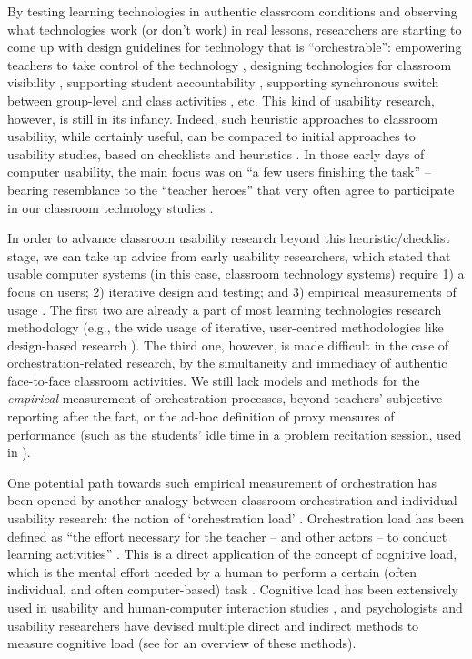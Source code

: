 \documentclass[10pt,journal,compsoc]{IEEEtran}
\begin{document}
By testing learning technologies in authentic classroom conditions and observing what technologies work (or don't work) in real lessons, researchers are starting to come up with design guidelines for technology that is ``orchestrable'': empowering teachers to take control of the technology \cite{Cuendet2013}, designing technologies for classroom visibility \cite{Dillenbourg2013}, supporting student accountability \cite{Kharrufa2013}, supporting synchronous switch between group-level and class activities \cite{Kreitmayer2013}, etc. This kind of usability research, however, is still in its infancy. Indeed, such heuristic approaches to classroom usability, while certainly useful, can be compared to initial approaches to usability studies, based on checklists \cite{ravden1989evaluating} and heuristics \cite{nielsen1992finding}. In those early days of computer usability, the main focus was on ``a few users finishing the task'' \cite{Webusability} -- bearing resemblance to the ``teacher heroes'' that very often agree to participate in our classroom technology studies \cite{Dillenbourg2009b}. 

In order to advance classroom usability research beyond this heuristic/checklist stage, we can take up advice from early usability researchers, which stated that usable computer systems (in this case, classroom technology systems) require 1) a focus on users; 2) iterative design and testing; and 3) empirical measurements of usage \cite{Gould1985}. The first two are already a part of most learning technologies research methodology (e.g., the wide usage of iterative, user-centred methodologies like design-based research \cite{wang2005design}). The third one, however, is made difficult in the case of orchestration-related research, by the simultaneity and immediacy of authentic face-to-face classroom activities. We still lack models and methods for the \textit{empirical} measurement of orchestration processes, beyond teachers' subjective reporting after the fact, or the ad-hoc definition of proxy measures of performance (such as the students' idle time in a problem recitation session, used in \cite{Alavi2012}).

One potential path towards such empirical measurement of orchestration has been opened by another analogy between classroom orchestration and individual usability research: the notion of `orchestration load' \cite{Dillenbourg2013}. Orchestration load has been defined as ``the effort necessary for the teacher -- and other actors -- to conduct learning activities'' \cite{Cuendet2013}. This is a direct application of the concept of cognitive load, which is the mental effort needed by a human to perform a certain (often individual, and often computer-based) task \cite{Paas2004}. Cognitive load has been extensively used in usability and human-computer interaction studies \cite{oviatt2004we}, and psychologists and usability researchers have devised multiple direct and indirect methods to measure cognitive load (see \cite{Brunken2003} for an overview of these methods). 
\end{document}
